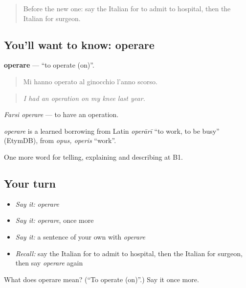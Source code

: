 \begin{quote}
Before the new one: say the Italian for to admit to hospital, then the Italian for surgeon.
\end{quote}

\subsection*{You'll want to know: operare}
\textbf{operare} — \textquotedblleft{}to operate (on)\textquotedblright{}.

\begin{quote}
Mi hanno operato al ginocchio l'anno scorso.
\end{quote}

\begin{quote}
\emph{I had an operation on my knee last year.}
\end{quote}

\emph{Farsi operare} — to have an operation.

\begin{cousinweb}
\emph{operare} is a learned borrowing from Latin \emph{operārī} \textquotedblleft{}to work, to be busy\textquotedblright{} (EtymDB), from \emph{opus, operis} \textquotedblleft{}work\textquotedblright{}.
\end{cousinweb}

\begin{grammarlens}[title={What you've built}]
One more word for telling, explaining and describing at B1.
\end{grammarlens}

\subsection*{Your turn}
\begin{itemize}
\raggedright
  \item \emph{Say it:} \emph{operare}
  \item \emph{Say it:} \emph{operare}, once more
  \item \emph{Say it:} a sentence of your own with \emph{operare}
  \item \emph{Recall:} say the Italian for to admit to hospital, then the Italian for surgeon, then say \emph{operare} again
\end{itemize}

\begin{tcolorbox}[breakable,colback=teal!4,colframe=teal!35!black,title={Before you move on}]
What does operare mean? (\textquotedblleft{}To operate (on)\textquotedblright{}.) Say it once more.
\end{tcolorbox}
